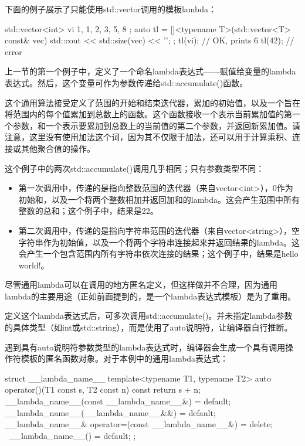 下面的例子展示了只能使用std::vector调用的模板lambda：

\begin{cpp}
std::vector<int> vi { 1, 1, 2, 3, 5, 8 };
auto tl = []<typename T>(std::vector<T> const& vec)
{
    std::cout << std::size(vec) << '\n';
};
tl(vi); // OK, prints 6
tl(42); // error
\end{cpp}


上一节的第一个例子中，定义了一个命名lambda表达式——赋值给变量的lambda表达式。然后，这个变量可作为参数传递给std::accumulate()函数。

这个通用算法接受定义了范围的开始和结束迭代器，累加的初始值，以及一个旨在将范围内的每个值累加到总数上的函数。这个函数接收一个表示当前累加值的第一个参数，和一个表示要累加到总数上的当前值的第二个参数，并返回新累加值。请注意，这里没有使用加法这个词，因为其不仅限于加法，还可以用于计算乘积、连接或其他聚合值的操作。

这个例子中的两次std::accumulate()调用几乎相同；只有参数类型不同：

\begin{itemize}
\item
第一次调用中，传递的是指向整数范围的迭代器（来自vector<int>），0作为初始和，以及一个将两个整数相加并返回加和的lambda。这会产生范围中所有整数的总和；这个例子中，结果是22。

\item
第二次调用中，传递的是指向字符串范围的迭代器（来自vector<string>），空字符串作为初始值，以及一个将两个字符串连接起来并返回结果的lambda。这会产生一个包含范围内所有字符串依次连接的结果；这个例子中，结果是hello world!。
\end{itemize}

尽管通用lambda可以在调用的地方匿名定义，但这样做并不合理，因为通用lambda的主要用途（正如前面提到的，是一个lambda表达式模板）是为了重用。

定义这个lambda表达式后，可多次调用std::accumulate()。并未指定lambda参数的具体类型（如int或std::string），而是使用了auto说明符，让编译器自行推断。

遇到具有auto说明符参数类型的lambda表达式时，编译器会生成一个具有调用操作符模板的匿名函数对象。对于本例中的通用lambda表达式：

\begin{cpp}
struct __lambda_name__
{
    template<typename T1, typename T2>
    auto operator()(T1 const s, T2 const n) const { return s + n; }
    __lambda_name__(const __lambda_name__&) = default;
    __lambda_name__(__lambda_name__&&) = default;
    __lambda_name__& operator=(const __lambda_name__&) = delete;
    ~__lambda_name__() = default;
};
\end{cpp}

